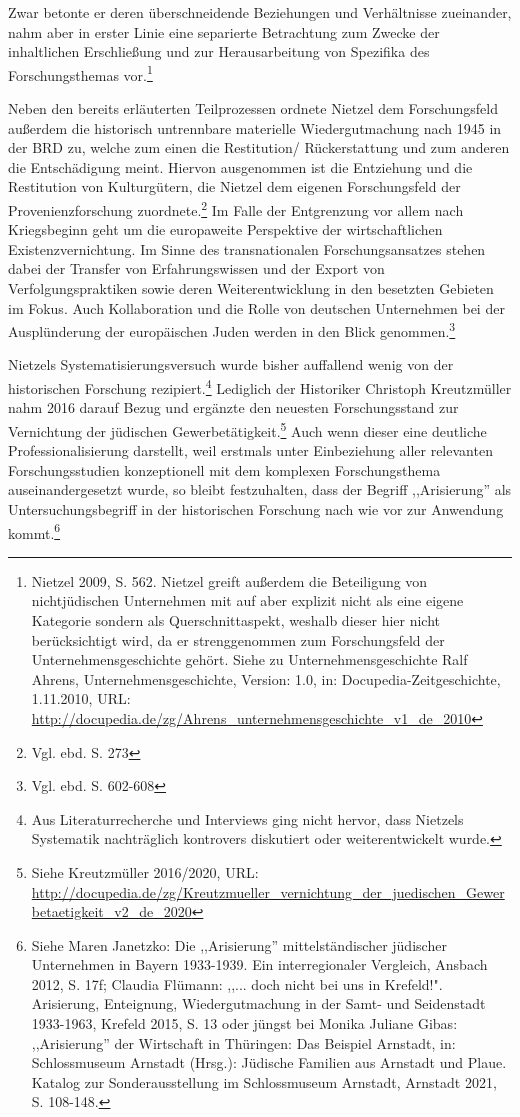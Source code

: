 Zwar betonte er deren überschneidende Beziehungen und Verhältnisse zueinander, nahm aber in erster Linie eine separierte Betrachtung zum Zwecke der inhaltlichen Erschließung und zur Herausarbeitung von Spezifika des Forschungsthemas vor.\footnote{Nietzel 2009, S. 562. Nietzel greift außerdem die Beteiligung von nichtjüdischen Unternehmen mit auf aber explizit nicht als eine eigene Kategorie sondern als Querschnittaspekt, weshalb dieser hier nicht berücksichtigt wird, da er strenggenommen zum Forschungsfeld der Unternehmensgeschichte gehört. Siehe zu Unternehmensgeschichte Ralf Ahrens, Unternehmensgeschichte, Version: 1.0, in: Docupedia-Zeitgeschichte, 1.11.2010, URL: \url{http://docupedia.de/zg/Ahrens_unternehmensgeschichte_v1_de_2010}} 

Neben den bereits erläuterten Teilprozessen ordnete Nietzel dem Forschungsfeld außerdem die historisch untrennbare materielle Wiedergutmachung nach 1945 in der BRD zu, welche zum einen die Restitution/ Rückerstattung und zum anderen die Entschädigung meint. Hiervon ausgenommen ist die Entziehung und die Restitution von Kulturgütern, die Nietzel dem eigenen Forschungsfeld der Provenienzforschung zuordnete.\footnote{Vgl. ebd. S. 273} Im Falle der Entgrenzung vor allem nach Kriegsbeginn geht um die europaweite Perspektive der wirtschaftlichen Existenzvernichtung. Im Sinne des transnationalen Forschungsansatzes stehen dabei der Transfer von Erfahrungswissen und der Export von Verfolgungspraktiken sowie deren Weiterentwicklung in den besetzten Gebieten im Fokus. Auch Kollaboration und die Rolle von deutschen Unternehmen bei der Ausplünderung der europäischen Juden werden in den Blick genommen.\footnote{Vgl. ebd. S. 602-608}

Nietzels Systematisierungsversuch wurde bisher auffallend wenig von der historischen Forschung rezipiert.\footnote{Aus Literaturrecherche und Interviews ging nicht hervor, dass Nietzels Systematik nachträglich kontrovers diskutiert oder weiterentwickelt wurde.} Lediglich der Historiker Christoph Kreutzmüller nahm 2016 darauf Bezug und ergänzte den neuesten Forschungsstand zur Vernichtung der jüdischen Gewerbetätigkeit.\footnote{Siehe Kreutzmüller 2016/2020,  URL: \url{http://docupedia.de/zg/Kreutzmueller_vernichtung_der_juedischen_Gewerbetaetigkeit_v2_de_2020}} Auch wenn dieser eine deutliche Professionalisierung darstellt, weil erstmals unter Einbeziehung aller relevanten Forschungsstudien konzeptionell mit dem komplexen Forschungsthema auseinandergesetzt wurde, so bleibt festzuhalten, dass der Begriff ,,Arisierung'' als Untersuchungsbegriff in der historischen Forschung nach wie vor zur Anwendung kommt.\footnote{Siehe Maren Janetzko: Die ,,Arisierung'' mittelständischer jüdischer Unternehmen in Bayern 1933-1939. Ein interregionaler Vergleich, Ansbach 2012, S. 17f; Claudia Flümann: ,,... doch nicht bei uns in Krefeld!". Arisierung, Enteignung, Wiedergutmachung in der Samt- und Seidenstadt 1933-1963, Krefeld 2015, S. 13 oder jüngst bei Monika Juliane Gibas: ,,Arisierung'' der Wirtschaft in Thüringen: Das Beispiel Arnstadt, in: Schlossmuseum Arnstadt (Hrsg.): Jüdische Familien aus Arnstadt und Plaue. Katalog zur Sonderausstellung im Schlossmuseum Arnstadt, Arnstadt 2021, S. 108-148.}  


